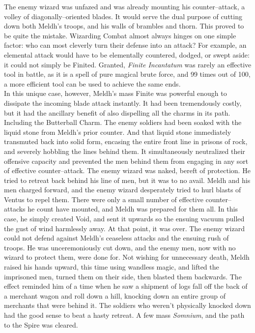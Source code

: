 The enemy wizard was unfazed and was already mounting his counter\mbox{--}attack, a volley of diagonally\mbox{--}oriented blades. It would serve the dual purpose of cutting down both Meldh’s troops, and his walls of brambles and thorn.
\SmallVSpace
This proved to be quite the mistake.
\SomeVSpace
Wizarding Combat almost always hinges on one simple factor: who can most cleverly turn their defense into an attack? For example, an elemental attack would have to be elementally countered, dodged, or swept aside: it could not simply be Finited. Granted, \emph{Finite Incantatum} was rarely an effective tool in battle, as it is a spell of pure magical brute force, and 99 times out of 100, a more efficient tool can be used to achieve the same ends.\\In this unique case, however, Meldh’s mass Finite was powerful enough to dissipate the incoming blade attack instantly. It had been tremendously costly, but it had the ancillary benefit of also dispelling all the charms in its path.
\SmallVSpace
Including the Butterball Charm.
\SmallVSpace
The enemy soldiers had been soaked with the liquid stone from Meldh’s prior counter. And that liquid stone immediately transmuted back into solid form, encasing the entire front line in prisons of rock, and severely hobbling the lines behind them. It simultaneously neutralized their offensive capacity and prevented the men behind them from engaging in any sort of effective counter\mbox{--}attack.
\SmallVSpace
The enemy wizard was naked, bereft of protection. He tried to retreat back behind his line of men, but it was to no avail. Meldh and his men charged forward, and the enemy wizard desperately tried to hurl blasts of Ventus to repel them. There were only a small number of effective counter\mbox{--}attacks he count have mounted, and Meldh was prepared for them all. In this case, he simply created Void, and sent it upwards so the ensuing vacuum pulled the gust of wind harmlessly away. At that point, it was over. The enemy wizard could not defend against Meldh’s ceaseless attacks and the ensuing rush of troops. He was unceremoniously cut down, and the enemy men, now with no wizard to protect them, were done for.
\SmallVSpace
Not wishing for unnecessary death, Meldh raised his hands upward, this time using wandless magic, and lifted the imprisoned men, turned them on their side, then blasted them backwards. The effect reminded him of a time when he saw a shipment of logs fall off the back of a merchant wagon and roll down a hill, knocking down an entire group of merchants that were behind it. The soldiers who weren’t physically knocked down had the good sense to beat a hasty retreat. A few mass \emph{Somnium}, and the path to the Spire was cleared.

